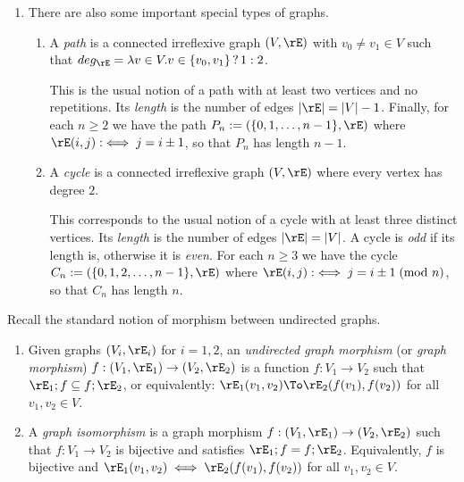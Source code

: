 \documentclass{article}
\begin{document}
\begin{definition}
\begin{enumerate}
  \item
  There are also some important special types of graphs.
  
  \begin{enumerate}
  \item
  A \emph{path} is a connected irreflexive graph $(V,\rE)$ with $v_0 \neq v_1 \in V$ such that $deg_\rE = \lambda v \in V. v \in \{v_0,v_1\} \, ? \, 1 : 2$.
  
  \smallskip
  This is the usual notion of a path with at least two vertices and no repetitions. Its \emph{length} is the number of edges $|\rE| = |V|-1$. Finally, for each $n \geq 2$ we have the path $P_n := (\{0,1,\dots,n-1\},\rE)$ where $\rE(i,j) :\iff j = i \pm 1$, so that $P_n$ has length $n-1$.
  
  \item
  A \emph{cycle} is a connected irreflexive graph $(V,\rE)$ where every vertex has degree $2$.
  
  \smallskip
  This corresponds to the usual notion of a cycle with at least three distinct vertices. Its \emph{length}  is the number of edges $|\rE| = |V|$. A cycle is \emph{odd} if its length is, otherwise it is \emph{even}. For each $n \geq 3$ we have the cycle $C_n := (\{0,1,2,\dots,n-1\},\rE)$ where $\rE(i,j) :\iff j = i \pm 1 \; \text{(mod $n$)}$, so that $C_n$ has length $n$. \endbox
  \end{enumerate}
  
  \end{enumerate}
  \end{definition}
  
  
  Recall the standard notion of morphism between undirected graphs.
  
  \begin{definition}
  \item
  \begin{enumerate}
  \item
  Given graphs $(V_i,\rE_i)$ for $i = 1,2$, an \emph{undirected graph morphism} (or \emph{graph morphism}) $f : (V_1,\rE_1) \to (V_2,\rE_2)$ is a function $f : V_1 \to V_2$ such that $\rE_1 ; f \subseteq f ; \rE_2$, or equivalently: $\rE_1(v_1,v_2) \To \rE_2(f(v_1),f(v_2))$ for all $v_1,v_2 \in V$.
  
  \item
  A \emph{graph isomorphism} is a graph morphism $f : (V_1,\rE_1) \to (V_2,\rE_2)$ such that $f : V_1 \to V_2$ is bijective and satisfies $\rE_1 ; f = f ; \rE_2$. Equivalently, $f$ is bijective and $\rE_1(v_1,v_2) \iff \rE_2(f(v_1),f(v_2))$ for all $v_1,v_2 \in V$. \endbox
  
  \end{enumerate}
  \end{definition}
  
\end{document}

